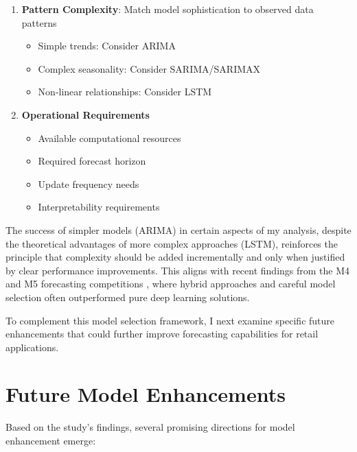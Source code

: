 \documentclass[12pt,a4paper]{report}
\begin{document}
\begin{enumerate}
    \item \textbf{Pattern Complexity}: Match model sophistication to observed data patterns
    \begin{itemize}
        \item Simple trends: Consider ARIMA
        \item Complex seasonality: Consider SARIMA/SARIMAX
        \item Non-linear relationships: Consider LSTM
    \end{itemize}
    
    \item \textbf{Operational Requirements}
    \begin{itemize}
        \item Available computational resources
        \item Required forecast horizon
        \item Update frequency needs
        \item Interpretability requirements
    \end{itemize}
\end{enumerate}

\sloppy
The success of simpler models (ARIMA) in certain aspects of my analysis, despite the theoretical advantages of more complex approaches (LSTM), reinforces the principle that complexity should be added incrementally and only when justified by clear performance improvements. This aligns with recent findings from the M4 and M5 forecasting competitions \citep{makridakis2022m5}, where hybrid approaches and careful model selection often outperformed pure deep learning solutions.
\fussy

To complement this model selection framework, I next examine specific future enhancements that could further improve forecasting capabilities for retail applications.

\section{Future Model Enhancements}
Based on the study's findings, several promising directions for model enhancement emerge:
\end{document}
